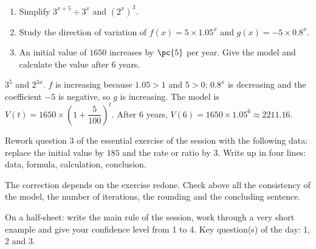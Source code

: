 \begin{exercise}[essential]
\begin{enumerate}\item Simplify $3^{x+5}\div3^x$ and $(2^x)^3$.\item Study the direction of variation of $f(x)=5\times\num{1,05}^x$ and $g(x)=-5\times\num{0,8}^x$.\item An initial value of $1650$ increases by $\pc{5}$ per year. Give the model and calculate the value after $6$ years.\end{enumerate}
\end{exercise}
\begin{solution}$3^5$ and $2^{3x}$. $f$ is increasing because $\num{1,05}>1$ and $5>0$; $\num{0,8}^x$ is decreasing and the coefficient $-5$ is negative, so $g$ is increasing. The model is $V(t)=1650\times\left(1+\dfrac{5}{100}\right)^t$. After $6$ years, $V(6)=1650\times\num{1,05}^6\approx\num{2211,16}$.\end{solution}


\begin{homework}Rework question 3 of the essential exercise of the session with the following data: replace the initial value by $185$ and the rate or ratio by $3$. Write up in four lines: data, formula, calculation, conclusion.\end{homework}
\begin{solution}The correction depends on the exercise redone. Check above all the consistency of the model, the number of iterations, the rounding and the concluding sentence.\end{solution}

\begin{exitticket}[3 minutes]On a half-sheet: write the main rule of the session, work through a very short example and give your confidence level from 1 to 4. Key question(s) of the day: 1, 2 and 3.\end{exitticket}

